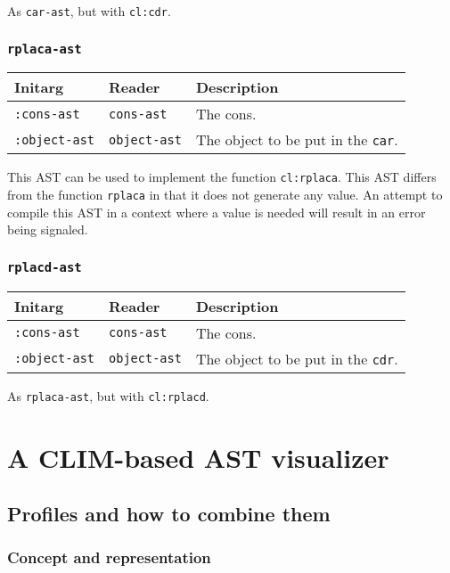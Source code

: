 As \texttt{car-ast}, but with \texttt{cl:cdr}.

\subsubsection{\texttt{rplaca-ast}}
\label{sec-ast-rplaca}

\begin{tabular}{|l|l|l|}
  \hline
  Initarg & Reader & Description\\
  \hline\hline
  \texttt{:cons-ast} & \texttt{cons-ast} & The cons.\\
  \hline
  \texttt{:object-ast} & \texttt{object-ast} & The object to be put in the \texttt{car}.\\
  \hline
\end{tabular}

This AST can be used to implement the function \texttt{cl:rplaca}.
This AST differs from the function \texttt{rplaca} in that it does
not generate any value. An attempt to compile this AST in a context
where a value is needed will result in an error being signaled.

\subsubsection{\texttt{rplacd-ast}}
\label{sec-ast-rplacd}

\begin{tabular}{|l|l|l|}
  \hline
  Initarg & Reader & Description\\
  \hline\hline
  \texttt{:cons-ast} & \texttt{cons-ast} & The cons.\\
  \hline
  \texttt{:object-ast} & \texttt{object-ast} & The object to be put in the \texttt{cdr}.\\
  \hline
\end{tabular}

As \texttt{rplaca-ast}, but with \texttt{cl:rplacd}.

\section{A CLIM-based AST visualizer}

\subsection{Profiles and how to combine them}

\subsubsection{Concept and representation}

